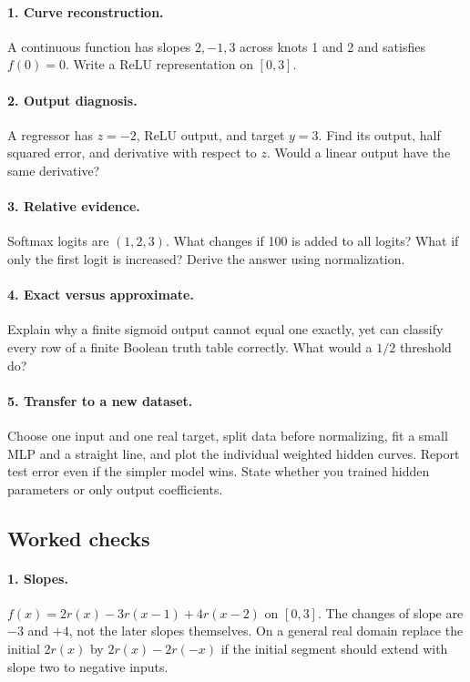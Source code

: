 \paragraph{1. Curve reconstruction.}
A continuous function has slopes $2,-1,3$ across knots 1 and 2 and satisfies $f(0)=0$. Write a ReLU representation on $[0,3]$.

\paragraph{2. Output diagnosis.}
A regressor has $z=-2$, ReLU output, and target $y=3$. Find its output, half squared error, and derivative with respect to $z$. Would a linear output have the same derivative?

\paragraph{3. Relative evidence.}
Softmax logits are $(1,2,3)$. What changes if 100 is added to all logits? What if only the first logit is increased? Derive the answer using normalization.

\paragraph{4. Exact versus approximate.}
Explain why a finite sigmoid output cannot equal one exactly, yet can classify every row of a finite Boolean truth table correctly. What would a $1/2$ threshold do?

\paragraph{5. Transfer to a new dataset.}
Choose one input and one real target, split data before normalizing, fit a small MLP and a straight line, and plot the individual weighted hidden curves. Report test error even if the simpler model wins. State whether you trained hidden parameters or only output coefficients.

\subsection{Worked checks}
\paragraph{1. Slopes.}
$f(x)=2r(x)-3r(x-1)+4r(x-2)$ on $[0,3]$. The changes of slope are $-3$ and $+4$, not the later slopes themselves. On a general real domain replace the initial $2r(x)$ by $2r(x)-2r(-x)$ if the initial segment should extend with slope two to negative inputs.

